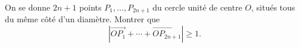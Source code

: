 On se donne $2n + 1$ points $P_1, \ldots, P_{2n+1}$ du cercle unité de centre $O$, situés tous du même côté d'un diamètre. Montrer que
\[ |\overrightarrow{OP_1} + \cdots + \overrightarrow{OP_{2n+1}}| \geq 1. \]
